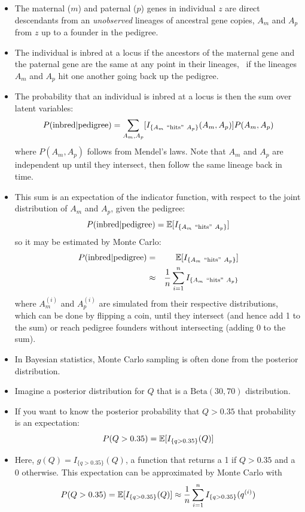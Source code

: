 \begin{itemize}
\item The maternal ($m$) and paternal ($p$) genes in individual $z$ are direct descendants from an {\em unobserved} lineages of ancestral gene copies, $A_m$ and $A_p$ from $z$ up to a founder in the pedigree.
\item The individual is inbred at a locus if the ancestors of the maternal gene and the paternal gene are the same at any point in their lineages, \ie ~if the lineages $A_m$ and $A_p$ hit one another going back up the pedigree.
\item The probability that an individual is inbred at a locus is then the sum over latent variables:
\[
	P(\mathrm{inbred}|\mathrm{pedigree}) = \sum_{A_m,A_p} [I_{\{A_m~\mathrm{``hits"}~A_p\}}(A_m, A_p )] P(A_m,A_p)
\]
where $P(A_m,A_p)$ follows from Mendel's laws.  Note that $A_m$ and $A_p$ are independent up until they intersect, then follow the same lineage back in time.
\newpage
\item This sum is an expectation of the indicator function, with respect to the joint distribution of $A_m$ and $A_p$, given the pedigree:
\[
	P(\mathrm{inbred}|\mathrm{pedigree}) = \Bbb{E} [I_{\{A_m~\mathrm{``hits"}~A_p\}}] 
\]
so it may be estimated by Monte Carlo:
\begin{eqnarray}
	P(\mathrm{inbred}|\mathrm{pedigree}) & = & \Bbb{E} [I_{\{A_m~\mathrm{``hits"}~A_p\}}] \nonumber \\
& \approx &
\frac{1}{n}\sum_{i=1}^n I_{\{A_m~\mathrm{``hits"}~A_p\}} \nonumber
\end{eqnarray}
where $A_m^{(i)}$ and  $A_p^{(i)}$ are simulated from their respective distributions, which can be done by flipping a coin, until they intersect (and hence add 1 to the sum) or reach pedigree founders without intersecting (adding 0 to the sum).
\end{itemize}




\begin{itemize}
\item In Bayesian statistics, Monte Carlo sampling is often done from the
posterior distribution. 
\item Imagine a posterior distribution for $Q$ that is a $\mathrm{Beta}(30, 70)$
distribution.  
\item If you want to know the posterior probability that $Q > 0.35$ that probability is an expectation:
$$
P(Q > 0.35) = \Bbb{E}[I_{\{q > 0.35\}}(Q)]
$$
\item Here, $g(Q) = I_{\{q > 0.35\}}(Q)$, a function that returns a 1 if $Q > 0.35$ and a 0 otherwise. This expectation can be approximated by Monte Carlo with
$$
P(Q > 0.35) = \Bbb{E}[I_{\{q > 0.35\}}(Q)] \approx 
\frac{1}{n} \sum_{i=1}^n I_{\{q > 0.35\}}(q^{(i)})	
$$
\end{itemize}


